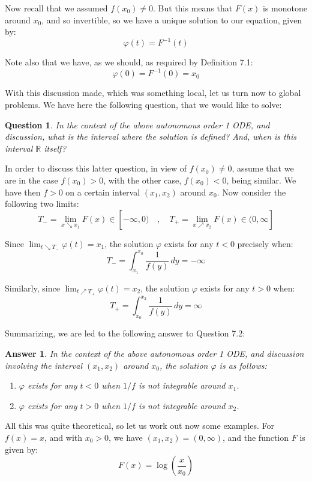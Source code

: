 \documentclass[12pt]{amsbook}
\newtheorem{answer}[theorem]{Answer}
\newtheorem{question}[theorem]{Question}
\begin{document}
Now recall that we assumed $f(x_0)\neq 0$. But this means that $F(x)$ is monotone around $x_0$, and so invertible, so we have a unique solution to our equation, given by:
$$\varphi(t)=F^{-1}(t)$$

Note also that we have, as we should, as required by Definition 7.1:
$$\varphi(0)=F^{-1}(0)=x_0$$

With this discussion made, which was something local, let us turn now to global problems. We have here the following question, that we would like to solve:

\begin{question}
In the context of the above autonomous order 1 ODE, and discussion, what is the interval where the solution is defined? And, when is this interval $\mathbb R$ itself?
\end{question}

In order to discuss this latter question, in view of $f(x_0)\neq0$, assume that we are in the case $f(x_0)>0$, with the other case, $f(x_0)<0$, being similar. We have then $f>0$ on a certain interval $(x_1,x_2)$ around $x_0$. Now consider the following two limits:
$$T_-=\lim_{x\searrow x_1}F(x)\in[-\infty,0)\quad,\quad T_+=\lim_{x\nearrow x_2}F(x)\in(0,\infty]$$

Since $\lim_{t\searrow T_-}\varphi(t)=x_1$, the solution $\varphi$ exists for any $t<0$ precisely when:
$$T_-=\int_{x_1}^{x_0}\frac{1}{f(y)}\,dy=-\infty$$

Similarly, since $\lim_{t\nearrow T_+}\varphi(t)=x_2$, the solution $\varphi$ exists for any $t>0$ when:
$$T_+=\int_{x_0}^{x_2}\frac{1}{f(y)}\,dy=\infty$$

Summarizing, we are led to the following answer to Question 7.2:

\begin{answer}
In the context of the above autonomous order 1 ODE, and discussion involving the interval $(x_1,x_2)$ around $x_0$, the solution $\varphi$ is as follows:
\begin{enumerate}
\item $\varphi$ exists for any $t<0$ when $1/f$ is not integrable around $x_1$.

\item $\varphi$ exists for any $t>0$ when $1/f$ is not integrable around $x_2$.
\end{enumerate}
\end{answer}

All this was quite theoretical, so let us work out now some examples. For $f(x)=x$, and with $x_0>0$, we have $(x_1,x_2)=(0,\infty)$, and the function $F$ is given by:
$$F(x)=\log\left(\frac{x}{x_0}\right)$$
\end{document}
